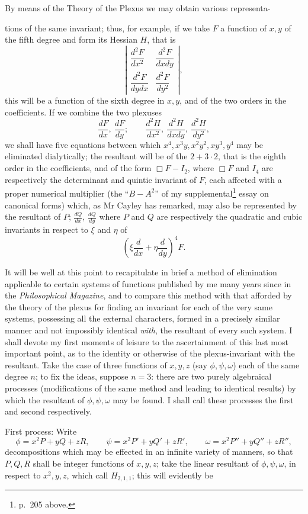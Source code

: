 \documentclass[11pt]{article}
\newcommand{\sourcepage}[1]{\marginpar{\scriptsize p.~#1}}
\begin{document}
{{By means of the Theory of the Plexus we may obtain various representa-

\sourcepage{298}
tions of the same invariant; thus, for example, if we take $F$ a function of $x,y$ of the fifth degree and form its Hessian $H$, that is
\[
\left|\begin{array}{cc}
\dfrac{d^2F}{dx^2}&\dfrac{d^2F}{dxdy}\\
\dfrac{d^2F}{dydx}&\dfrac{d^2F}{dy^2}
\end{array}\right|,
\]
this will be a function of the sixth degree in $x,y$, and of the two orders in the coefficients. If we combine the two plexuses
\[
\frac{dF}{dx},\ \frac{dF}{dy};
\qquad
\frac{d^2H}{dx^2},\ \frac{d^2H}{dxdy},\ \frac{d^2H}{dy^2},
\]
we shall have five equations between which $x^4,x^3y,x^2y^2,xy^3,y^4$ may be eliminated dialytically; the resultant will be of the $2+3\cdot2$, that is the eighth order in the coefficients, and of the form $\Box F-I_2$, where $\Box F$ and $I_4$ are respectively the determinant and quintic invariant of $F$, each affected with a proper numerical multiplier (the ``$B-A^2$'' of my supplemental\footnote{p.~205 above.} essay on canonical forms) which, as Mr Cayley has remarked, may also be represented by the resultant of $P$; $\frac{dQ}{dx}$, $\frac{dQ}{dy}$ where $P$ and $Q$ are respectively the quadratic and cubic invariants in respect to $\xi$ and $\eta$ of
\[
\left(\xi\frac{d}{dx}+\eta\frac{d}{dy}\right)^4F.
\]

It will be well at this point to recapitulate in brief a method of elimination applicable to certain systems of functions published by me many years since in the \emph{Philosophical Magazine}, and to compare this method with that afforded by the theory of the plexus for finding an invariant for each of the very same systems, possessing all the external characters, formed in a precisely similar manner and not impossibly identical \emph{with}, the resultant of every such system. I shall devote my first moments of leisure to the ascertainment of this last most important point, as to the identity or otherwise of the plexus-invariant with the resultant. Take the case of three functions of $x,y,z$ (say $\phi,\psi,\omega$) each of the same degree $n$; to fix the ideas, suppose $n=3$: there are two purely algebraical processes (modifications of the same method and leading to identical results) by which the resultant of $\phi,\psi,\omega$ may be found. I shall call these processes the first and second respectively.

First process: Write
\[
\phi=x^2P+yQ+zR,
\qquad
\psi=x^2P'+yQ'+zR',
\qquad
\omega=x^2P''+yQ''+zR'',
\]
decompositions which may be effected in an infinite variety of manners, so that $P,Q,R$ shall be integer functions of $x,y,z$; take the linear resultant of $\phi,\psi,\omega$, in respect to $x^2,y,z$, which call $H_{2,1,1}$; this will evidently be

}}
\end{document}
